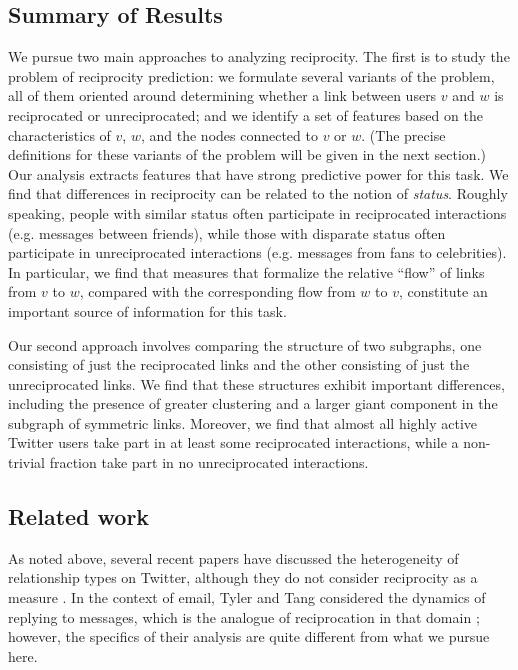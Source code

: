 \documentclass[conference]{IEEEtran}
\begin{document}
\subsection{Summary of Results}

We pursue two main approaches to analyzing reciprocity.
The first is to study the problem of reciprocity prediction:
we formulate several variants of the problem, all of them
oriented around determining whether a link between users $v$ and $w$
is reciprocated or unreciprocated;
and we identify a set of features based on the characteristics of $v$, $w$,
and the nodes connected to $v$ or $w$.  
(The precise definitions for these variants of the problem will be given in 
the next section.)
Our analysis extracts features that have strong predictive
power for this task.
We find that differences in reciprocity can be related to the 
notion of {\em status}.
Roughly speaking, people with similar status often participate in reciprocated
interactions (e.g. messages between friends), while those with
disparate status often participate in unreciprocated interactions (e.g.
messages from fans to celebrities).
In particular, we find that measures that formalize the 
relative ``flow'' of links from $v$ to $w$,
compared with the corresponding flow from $w$ to $v$, constitute
an important source of information for this task.

Our second approach involves comparing the structure of two subgraphs, 
one consisting of just the reciprocated links and the other
consisting of just the unreciprocated links.
We find that these structures exhibit important differences, including 
the presence of greater clustering and a larger giant component in the
subgraph of symmetric links.
Moreover, we find that almost all highly active Twitter users
take part in at least some reciprocated interactions, 
while a non-trivial fraction take part in no unreciprocated interactions.

\subsection{Related work}

As noted above, several recent papers have discussed the 
heterogeneity of relationship types on Twitter,
although they do not consider reciprocity as a measure
\cite{kwak-what-is-twitter,romero-directed-closure}.
In the context of email, Tyler and Tang considered the dynamics
of replying to messages, which is the analogue of reciprocation
in that domain \cite{Tyler:2003tq}; however, the specifics of their
analysis are quite different from what we pursue here.
\end{document}
